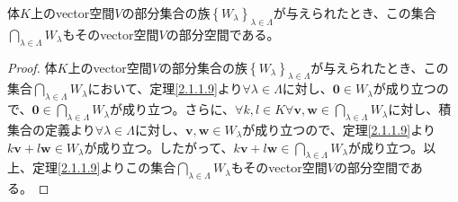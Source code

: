 \documentclass[dvipdfmx]{jsarticle}
\begin{document}
\begin{thm}\label{2.1.1.10}
体$K$上のvector空間$V$の部分集合の族$\left\{ W_{\lambda} \right\}_{\lambda \in \varLambda}$が与えられたとき、この集合$\bigcap_{\lambda \in \varLambda} W_{\lambda}$もそのvector空間$V$の部分空間である。
\end{thm}
\begin{proof}
体$K$上のvector空間$V$の部分集合の族$\left\{ W_{\lambda} \right\}_{\lambda \in \varLambda}$が与えられたとき、この集合$\bigcap_{\lambda \in \varLambda} W_{\lambda}$において、定理\ref{2.1.1.9}より$\forall\lambda \in \varLambda$に対し、$\mathbf{0} \in W_{\lambda}$が成り立つので、$\mathbf{0} \in \bigcap_{\lambda \in \varLambda} W_{\lambda}$が成り立つ。さらに、$\forall k,l \in K\forall\mathbf{v},\mathbf{w} \in \bigcap_{\lambda \in \varLambda} W_{\lambda}$に対し、積集合の定義より$\forall\lambda \in \varLambda$に対し、$\mathbf{v},\mathbf{w} \in W_{\lambda}$が成り立つので、定理\ref{2.1.1.9}より$k\mathbf{v} + l\mathbf{w} \in W_{\lambda}$が成り立つ。したがって、$k\mathbf{v} + l\mathbf{w} \in \bigcap_{\lambda \in \varLambda} W_{\lambda}$が成り立つ。以上、定理\ref{2.1.1.9}よりこの集合$\bigcap_{\lambda \in \varLambda} W_{\lambda}$もそのvector空間$V$の部分空間である。
\end{proof}
\end{document}
